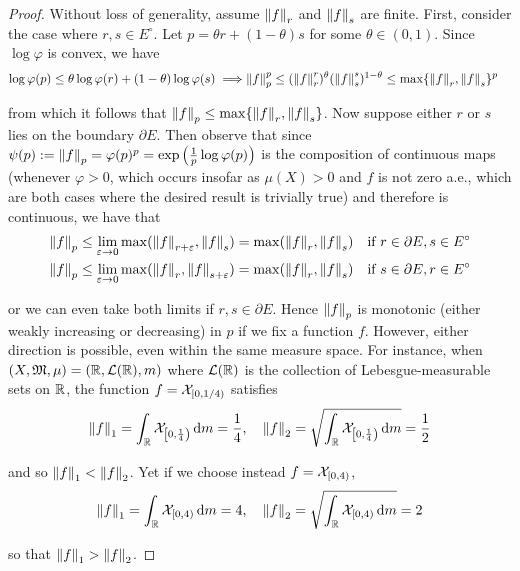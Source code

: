 \begin{proof}
     Without loss of generality, assume \(\norm{f}_r\) and \(\norm{f}_s\) are finite. First, consider the case where \(r, s \in E^\circ\). Let \(p = \theta r + (1 - \theta) s\) for some \(\theta \in (0, 1)\). Since \(\log\varphi\) is convex, we have 
    \begin{align*}
        \log\varphi(p) \leq \theta \log\varphi(r) + (1 - \theta) \log\varphi(s) 
        \implies & \norm{f}_p^p \leq (\norm{f}_r^r)^\theta (\norm{f}_s^s)^{1 - \theta} 
        \leq \max\{\norm{f}_r, \norm{f}_s\}^p 
    \end{align*}

    from which it follows that \(\norm{f}_p \leq \max\{ \norm{f}_r, \norm{f}_s \}\). Now suppose either \(r\) or \(s\) lies on the boundary \(\partial E\). Then observe that since \(\psi(p) := \norm{f}_p = \varphi(p)^p = \exp \left( \frac{1}{p} \log \varphi(p) \right)\) is the composition of continuous maps (whenever \(\varphi > 0\), which occurs insofar as \(\mu(X) > 0\) and \(f\) is not zero a.e., which are both cases where the desired result is trivially true) and therefore is continuous, we have that
    \begin{align*}
        & \norm{f}_p \leq \lim_{\varepsilon \to 0} \max( \norm{f}_{r + \varepsilon}, \norm{f}_s ) = \max( \norm{f}_r, \norm{f}_s) 
        \quad \text{if } r \in \partial E, s \in E^\circ \\
        & \norm{f}_p \leq \lim_{\varepsilon \to 0} \max( \norm{f}_r, \norm{f}_{s + \varepsilon} ) = \max( \norm{f}_r, \norm{f}_s) 
        \quad \text{if } s \in \partial E, r \in E^\circ
    \end{align*}

    or we can even take both limits if \(r, s \in \partial E\). Hence \(\norm{f}_p\) is monotonic (either weakly increasing or decreasing) in \(p\) if we fix a function \(f\). However, either direction is possible, even within the same measure space. For instance, when \((X, \mathfrak{M}, \mu) = (\mathbb{R}, \mathcal{L}(\mathbb{R}), m)\) where \(\mathcal{L}(\mathbb{R})\) is the collection of Lebesgue-measurable sets on \(\mathbb{R}\), the function \(f=\mathcal{X}_{[0, 1/4)}\) satisfies
    \[
        \norm{f}_1 = \int_\mathbb{R} \mathcal{X}_{\left[0, \frac{1}{4}\right)} \, \mathrm{d}m = \frac{1}{4},
        \quad 
        \norm{f}_2 = \sqrt{\int_\mathbb{R} \mathcal{X}_{\left[0, \frac{1}{4}\right)} \, \mathrm{d}m} = \frac{1}{2}
    \]

    and so \(\norm{f}_1 < \norm{f}_2\). Yet if we choose instead \(f = \mathcal{X}_{[0, 4)}\), 
    \[
        \norm{f}_1 = \int_{\mathbb{R}} \mathcal{X}_{[0, 4)} \, \mathrm{d}m = 4,
        \quad
        \norm{f}_2 = \sqrt{\int_{\mathbb{R}} \mathcal{X}_{[0, 4)} \, \mathrm{d}m} = 2
    \]

    so that \(\norm{f}_1 > \norm{f}_2\). 
\end{proof}

